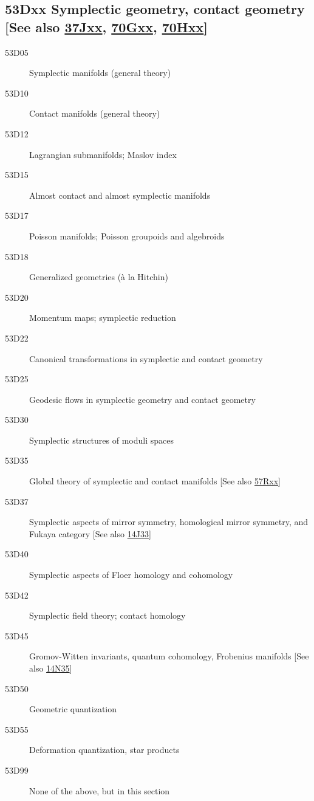 \documentclass[letterpaper]{article}
\begin{document}
\subsection*{53Dxx  Symplectic geometry, contact geometry [See also \hyperref[37Jxx]{37Jxx}, \hyperref[70Gxx]{70Gxx}, \hyperref[70Hxx]{70Hxx}] }\label{53Dxx}
\begin{description}  
\item [53D05]\label{53D05} Symplectic manifolds (general theory)
\item [53D10]\label{53D10} Contact manifolds (general theory)
\item [53D12]\label{53D12} Lagrangian submanifolds; Maslov index
\item [53D15]\label{53D15} Almost contact and almost symplectic manifolds
\item [53D17]\label{53D17} Poisson manifolds; Poisson groupoids and algebroids
\item [53D18]\label{53D18} Generalized geometries (\`{a} la Hitchin)
\item [53D20]\label{53D20} Momentum maps; symplectic reduction 
\item [53D22]\label{53D22} Canonical transformations in symplectic and contact geometry
\item [53D25]\label{53D25} Geodesic flows in symplectic geometry and contact geometry
\item [53D30]\label{53D30} Symplectic structures of moduli spaces
\item [53D35]\label{53D35} Global theory of symplectic and contact manifolds [See also \hyperref[57Rxx]{57Rxx}]
\item [53D37]\label{53D37} Symplectic aspects of mirror symmetry, homological mirror symmetry, and Fukaya category [See also \hyperref[14J33]{14J33}]
\item [53D40]\label{53D40} Symplectic aspects of Floer homology and cohomology
\item [53D42]\label{53D42} Symplectic field theory; contact homology
\item [53D45]\label{53D45} Gromov-Witten invariants, quantum cohomology, Frobenius manifolds [See also \hyperref[14N35]{14N35}]
\item [53D50]\label{53D50} Geometric quantization
\item [53D55]\label{53D55} Deformation quantization, star products
\item [53D99]\label{53D99} None of the above, but in this section
\end{description}
\end{document}
